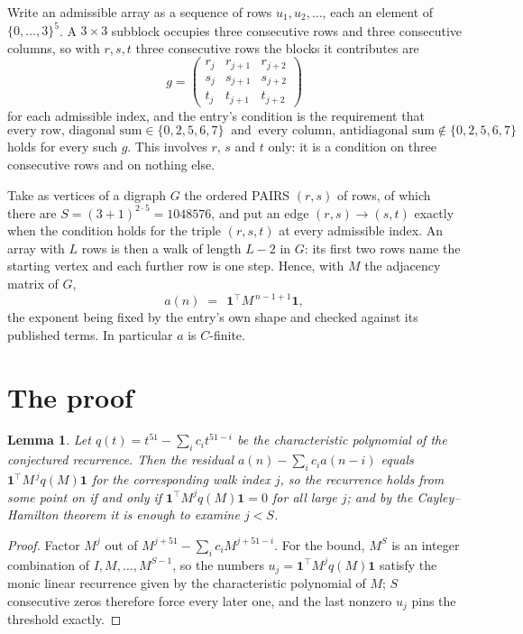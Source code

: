 \documentclass[11pt,a4paper]{article}
\theoremstyle{plain}
\newtheorem{lemma}[theorem]{Lemma}
\theoremstyle{definition}
\begin{document}
Write an admissible array as a sequence of rows $u_1,u_2,\dots$, each an element of
$\{0,\dots,3\}^{5}$. A $3\times3$ subblock occupies three consecutive rows and
three consecutive columns, so with $r,s,t$ three consecutive rows the blocks it
contributes are
\[
g=\begin{pmatrix}r_j&r_{j+1}&r_{j+2}\\ s_j&s_{j+1}&s_{j+2}\\ t_j&t_{j+1}&t_{j+2}\end{pmatrix}
\]
for each admissible index, and the entry's condition is the requirement that
\[
\text{every row, diagonal sum} \in \{0,2,5,6,7\}\ \text{ and }\ \text{every column, antidiagonal sum} \notin \{0,2,5,6,7\}
\]
holds for every such $g$. This involves $r$, $s$ and $t$ only: it is a condition on
three consecutive rows and on nothing else.

Take as vertices of a digraph $G$ the ordered PAIRS $(r,s)$ of rows, of which there are
$S=(3+1)^{2\cdot5}=1048576$, and put an edge $(r,s)\to(s,t)$ exactly when the condition
holds for the triple $(r,s,t)$ at every admissible index. An array with $L$ rows is then a
walk of length $L-2$ in $G$: its first two rows name the starting vertex and each further
row is one step. Hence, with $M$ the adjacency matrix of $G$,
\[
a(n)\;=\;\,\mathbf{1}^{\!\top}M^{\,n-1+1}\mathbf{1},
\]
the exponent being fixed by the entry's own shape and checked against its published terms.
In particular $a$ is $C$-finite.

\section{The proof}

\begin{lemma}\label{lem:crit}
Let $q(t)=t^{51}-\sum_i c_it^{51-i}$ be the characteristic polynomial of the
conjectured recurrence. Then the residual $a(n)-\sum_ic_ia(n-i)$ equals
$\mathbf{1}^{\!\top}M^{\,j}q(M)\mathbf{1}$ for the corresponding walk index
$j$, so the recurrence holds from some point on if and only if
$\mathbf{1}^{\!\top}M^{j}q(M)\mathbf{1}=0$ for all large $j$; and by the
Cayley--Hamilton theorem it is enough to examine $j<S$.
\end{lemma}

\begin{proof}
Factor $M^{j}$ out of $M^{j+51}-\sum_ic_iM^{j+51-i}$. For the bound, $M^{S}$
is an integer combination of $I,M,\dots,M^{S-1}$, so the numbers
$u_j=\mathbf{1}^{\!\top}M^{j}q(M)\mathbf{1}$ satisfy the monic linear recurrence given by
the characteristic polynomial of $M$; $S$ consecutive zeros therefore force every later one,
and the last nonzero $u_j$ pins the threshold exactly.
\end{proof}
\end{document}
